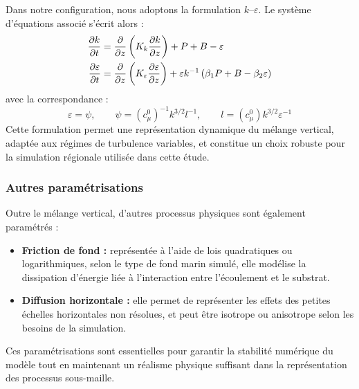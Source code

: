 Dans notre configuration, nous adoptons la formulation $k$–$\varepsilon$. Le système d’équations associé s’écrit alors :
\begin{subequations}
\label{eq:k-eps}	
\begin{align}
	\frac{\partial k}{\partial t} & = \frac{\partial }{\partial z} \left( K_k \frac{\partial k}{\partial z} \right) + P + B - \varepsilon \\
	\frac{\partial \varepsilon}{\partial t} & = \frac{\partial }{\partial z} \left( K_\varepsilon \frac{\partial \varepsilon}{\partial z} \right) + \varepsilon k^{-1} \left( \beta_1 P + B - \beta_2 \varepsilon \right)
\end{align}
\end{subequations}
avec la correspondance :
\begin{equation}
\varepsilon = \psi, \qquad \psi = \left(c^0_\mu\right)^{-1} k^{3/2} l^{-1}, \qquad l = \left(c^0_\mu\right) k^{3/2} \varepsilon^{-1}
\end{equation}
Cette formulation permet une représentation dynamique du mélange vertical, adaptée aux régimes de turbulence variables, et constitue un choix robuste pour la simulation régionale utilisée dans cette étude.

\subsubsection{Autres paramétrisations}

Outre le mélange vertical, d’autres processus physiques sont également paramétrés :
\begin{itemize}
	\item \textbf{Friction de fond :} représentée à l’aide de lois quadratiques ou logarithmiques, selon le type de fond marin simulé, elle modélise la dissipation d’énergie liée à l’interaction entre l’écoulement et le substrat.
	\item \textbf{Diffusion horizontale :} elle permet de représenter les effets des petites échelles horizontales non résolues, et peut être isotrope ou anisotrope selon les besoins de la simulation.
\end{itemize}

Ces paramétrisations sont essentielles pour garantir la stabilité numérique du modèle tout en maintenant un réalisme physique suffisant dans la représentation des processus sous-maille.









